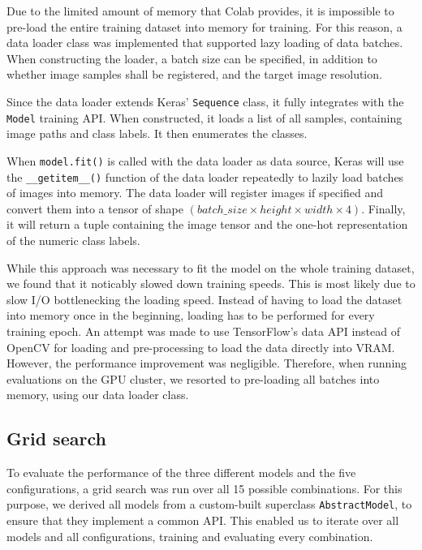 \documentclass{l4proj}
\begin{document}
Due to the limited amount of memory that Colab provides, it is impossible to pre-load the entire training dataset into memory for training. For this reason, a data loader class was implemented that supported lazy loading of data batches. When constructing the loader, a batch size can be specified, in addition to whether image samples shall be registered, and the target image resolution. 

Since the data loader extends Keras' \lstinline{Sequence} class, it fully integrates with the \lstinline{Model} training API. When constructed, it loads a list of all samples, containing image paths and class labels. It then enumerates the classes.

When \lstinline{model.fit()} is called with the data loader as data source, Keras will use the \lstinline{__getitem__()} function of the data loader repeatedly to lazily load batches of images into memory. The data loader will register images if specified and convert them into a tensor of shape $(batch\_size \times height \times width \times 4)$. Finally, it will return a tuple containing the image tensor and the one-hot representation of the numeric class labels.

While this approach was necessary to fit the model on the whole training dataset, we found that it noticably slowed down training speeds. This is most likely due to slow I/O bottlenecking the loading speed. Instead of having to load the dataset into memory once in the beginning, loading has to be performed for every training epoch. An attempt was made to use TensorFlow's data API instead of OpenCV for loading and pre-processing to load the data directly into VRAM. However, the performance improvement was negligible. Therefore, when running evaluations on the GPU cluster, we resorted to pre-loading all batches into memory, using our data loader class.

\subsection{Grid search}
\label{gridsearch_impl}

To evaluate the performance of the three different models and the five configurations, a grid search was run over all 15 possible combinations. For this purpose, we derived all models from a custom-built superclass \lstinline{AbstractModel}, to ensure that they implement a common API. This enabled us to iterate over all models and all configurations, training and evaluating every combination.
\end{document}
